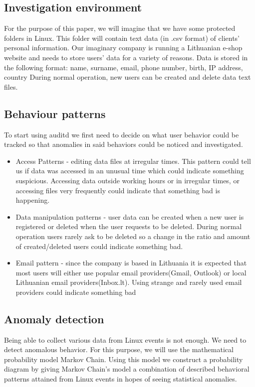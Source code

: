 \documentclass{VUMIFPSmagistrinis}
\begin{document}
    \subsection{Investigation environment}
        For the purpose of this paper, we will imagine that we have some protected folders in Linux.
        This folder will contain text data (in .csv format) of clients' personal information.
        Our imaginary company is running a Lithuanian e-shop website and needs to store users' data for a variety of reasons.
        Data is stored in the following format: name, surname, email, phone number, birth, IP address, country
        During normal operation, new users can be created and delete data text files.
    \subsection{Behaviour patterns}
        To start using auditd we first need to decide on what user behavior could be tracked so that anomalies in said behaviors could be noticed and investigated.

        \begin{itemize}
            \item Access Patterns - editing data files at irregular times. This pattern could tell us if data was accessed in an unusual time which could indicate something suspicious. Accessing data outside working hours or in irregular times, or accessing files very frequently could indicate that something bad is happening.
            \item Data manipulation patterns - user data can be created when a new user is registered or deleted when the user requests to be deleted. 
            During normal operation users rarely ask to be deleted so a change in the ratio and amount of created/deleted users could indicate something bad.
            \item Email pattern - since the company is based in Lithuania it is expected that most users will either use popular email providers(Gmail, Outlook) or local Lithuanian email providers(Inbox.lt).
            Using strange and rarely used email providers could indicate something bad
        \end{itemize}

    \subsection{Anomaly detection}
        Being able to collect various data from Linux events is not enough.
        We need to detect anomalous behavior. 
        For this purpose, we will use the mathematical probability model Markov Chain.
        Using this model we construct a probability diagram by giving Markov Chain's model a combination of described behavioral patterns attained from Linux events in hopes of seeing statistical anomalies.
\end{document}
